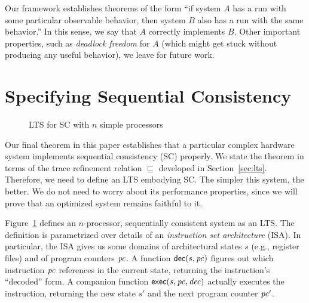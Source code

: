 Our framework establishes theorems of the form ``if system $A$ has a run with
some particular observable behavior, then system $B$ also has a run with the
same behavior.''  In this sense, we say that $A$ correctly implements $B$.
Other important properties, such as \emph{deadlock freedom} for $A$ (which
might get stuck without producing any useful behavior), we leave for future
work.

\section{Specifying Sequential Consistency}\label{sec:sc}

\begin{figure}
\small
\centering
\begin{boxedminipage}[c]{.48\textwidth}
{}
{}

{}

{}

{}
\end{boxedminipage}
\caption{LTS for SC with $n$ simple processors}
\label{Ref}
\end{figure}

Our final theorem in this paper establishes that a particular complex hardware
system implements sequential consistency (SC) properly.  We state the theorem
in terms of the trace refinement relation $\sqsubseteq$ developed in
Section~\ref{sec:lts}.
Therefore, we need to define an LTS embodying SC.  The simpler this
system, the better.  We do not need to worry about its performance properties,
since we will prove that an optimized system remains faithful to it.

Figure~\ref{Ref} defines an $n$-processor, sequentially consistent system as an
LTS.  The definition is parametrized over details of an \emph{instruction set
architecture} (ISA).  In particular, the ISA gives us some domains of
architectural states $s$ (e.g., register files) and of program counters $\mathit{pc}$.
A function $\mathsf{dec}(s, \mathit{pc})$ figures out which instruction $\mathit{pc}$ references in the
current state, returning the instruction's ``decoded'' form.  A companion
function $\mathsf{exec}(s, \mathit{pc}, \mathit{dec})$ actually executes the instruction,
returning the new state $s'$ and the next program counter $\mathit{pc}'$.


